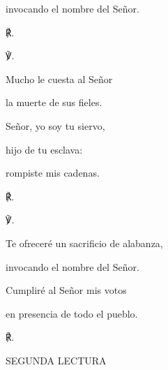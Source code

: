 			\begin{readtabbed}invocando el nombre del Señor. \begin{readred}℟.\end{readred}\end{readtabbed}
			
			\begin{readps}\begin{readred}℣.\end{readred} Mucho le cuesta al Señor \end{readps}
			
			\begin{readtabbed}la muerte de sus fieles. \end{readtabbed}
			
			\begin{readtabbed}Señor, yo soy tu siervo, \end{readtabbed}
			
			\begin{readtabbed}hijo de tu esclava: \end{readtabbed}
			
			\begin{readtabbed}rompiste mis cadenas. \begin{readred}℟.\end{readred}\end{readtabbed}
			
			\begin{readps}\begin{readred}℣.\end{readred} Te ofreceré un sacrificio de alabanza, \end{readps}
			
			\begin{readtabbed}invocando el nombre del Señor. \end{readtabbed}
			
			\begin{readtabbed}Cumpliré al Señor mis votos \end{readtabbed}
			
			\begin{readtabbed}en presencia de todo el pueblo. \begin{readred}℟.\end{readred}\end{readtabbed}
			
			\begin{readtitle}SEGUNDA LECTURA\end{readtitle}
			
